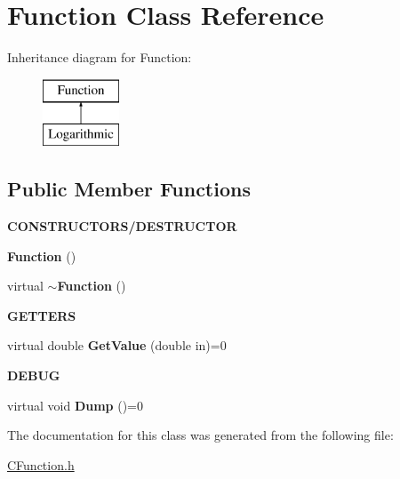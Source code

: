 \hypertarget{class_function}{\section{\-Function \-Class \-Reference}
\label{class_function}
}
\-Inheritance diagram for \-Function\-:\begin{figure}[H]
\begin{center}
\leavevmode
\includegraphics[height=2.000000cm]{class_function}
\end{center}
\end{figure}
\subsection*{\-Public \-Member \-Functions}
\begin{Indent}{\bf \-C\-O\-N\-S\-T\-R\-U\-C\-T\-O\-R\-S/\-D\-E\-S\-T\-R\-U\-C\-T\-O\-R}\par
\begin{DoxyCompactItemize}
\item 
\hypertarget{class_function_ae206568fd4fd4c885e3ccff76345c4e6}{{\bfseries \-Function} ()}\label{class_function_ae206568fd4fd4c885e3ccff76345c4e6}

\item 
\hypertarget{class_function_a8697b2e490a4314a7ccbb17aea8ce537}{virtual {\bfseries $\sim$\-Function} ()}\label{class_function_a8697b2e490a4314a7ccbb17aea8ce537}

\end{DoxyCompactItemize}
\end{Indent}
\begin{Indent}{\bf \-G\-E\-T\-T\-E\-R\-S}\par
\begin{DoxyCompactItemize}
\item 
\hypertarget{class_function_a9366fb3fd16ead3765c1941b99382f55}{virtual double {\bfseries \-Get\-Value} (double in)=0}\label{class_function_a9366fb3fd16ead3765c1941b99382f55}

\end{DoxyCompactItemize}
\end{Indent}
\begin{Indent}{\bf \-D\-E\-B\-U\-G}\par
\begin{DoxyCompactItemize}
\item 
\hypertarget{class_function_a51fd4ce060dce32ea24d85486dc75ac2}{virtual void {\bfseries \-Dump} ()=0}\label{class_function_a51fd4ce060dce32ea24d85486dc75ac2}

\end{DoxyCompactItemize}
\end{Indent}


\-The documentation for this class was generated from the following file\-:\begin{DoxyCompactItemize}
\item 
\hyperlink{_c_function_8h}{\-C\-Function.\-h}\end{DoxyCompactItemize}
